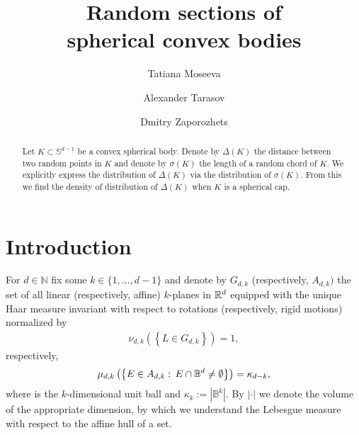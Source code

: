 \documentclass[12pt, reqno]{amsart}
\begin{document}
\author[T.~Moseeva]{Tatiana Moseeva}
\address{Tatiana Moseeva, Leonhard Euler International Mathematical Institute, Russia}

\author[A.~Tarasov]{Alexander Tarasov}
\address{Alexander Tarasov, Saint Petersburg State University, Russia}

\author[D.~Zaporozhets]{Dmitry Zaporozhets}
\address{Dmitry Zaporozhets, St.~Petersburg Department of Steklov Institute of Mathematics, Russia}


\title[Random sections of spherical convex bodies]{Random sections of \\ spherical convex bodies}




\begin{abstract}
Let $K\subset\mathbb S^{d-1}$ be a convex spherical body. Denote by $\Delta(K)$ the distance between two random points in $K$ and denote by $\sigma(K)$ the length of a random chord of $K$. We explicitly express the distribution of $\Delta(K)$ via the distribution of $\sigma(K)$.  From this  we find the density of distribution of $\Delta(K)$ when $K$ is a spherical cap. 
\end{abstract}

\maketitle

\section{Introduction}
For $d\in\mathbb N$ fix some $k\in\{1,\dots,d-1\}$ and denote by $G_{d,k}$ (respectively, $A_{d,k})$  the set of all linear (respectively, affine) $k$-planes  in $\mathbb{R}^d$ equipped with the unique Haar measure invariant with respect to rotations (respectively, rigid motions) normalized by
\begin{align*}
    \nu_{d,k}\left(\left\{L\in G_{d,k}\right\}\right)=1,
\end{align*}
respectively,
\begin{align*}
    \mu_{d,k}\left(\left\{E\in A_{d,k}:\,E\cap \mathbb{B}^d\ne\emptyset\right\}\right)=\kappa_{d-k},
\end{align*}
where is  the $k$-dimensional unit ball and $\kappa_k:=|\mathbb B^k|$. By $|\cdot|$ we denote the volume of the appropriate dimension, by which we understand the Lebesgue measure with respect to the affine hull of a set. 
\end{document}
